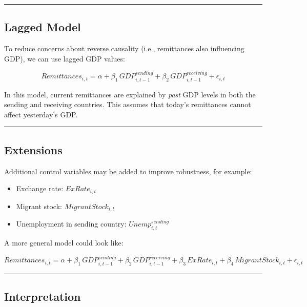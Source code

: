 \documentclass[
  11pt,
]{article}
\providecommand{\tightlist}{%
  \setlength{\itemsep}{0pt}\setlength{\parskip}{0pt}}\usepackage{longtable,booktabs,array}
\begin{document}
\begin{center}\rule{0.5\linewidth}{0.5pt}\end{center}

\subsection{Lagged Model}\label{lagged-model}

To reduce concerns about reverse causality (i.e., remittances also
influencing GDP), we can use lagged GDP values:

\[
Remittances_{i,t} = \alpha 
+ \beta_1 \, GDP^{sending}_{i,t-1} 
+ \beta_2 \, GDP^{receiving}_{i,t-1} 
+ \epsilon_{i,t}
\]

In this model, current remittances are explained by \emph{past} GDP
levels in both the sending and receiving countries. This assumes that
today's remittances cannot affect yesterday's GDP.

\begin{center}\rule{0.5\linewidth}{0.5pt}\end{center}

\subsection{Extensions}\label{extensions}

Additional control variables may be added to improve robustness, for
example:

\begin{itemize}
\tightlist
\item
  Exchange rate: \(ExRate_{i,t}\)\\
\item
  Migrant stock: \(MigrantStock_{i,t}\)\\
\item
  Unemployment in sending country: \(Unemp^{sending}_{i,t}\)
\end{itemize}

A more general model could look like:

\[
Remittances_{i,t} = \alpha 
+ \beta_1 \, GDP^{sending}_{i,t-1} 
+ \beta_2 \, GDP^{receiving}_{i,t-1} 
+ \beta_3 \, ExRate_{i,t} 
+ \beta_4 \, MigrantStock_{i,t} 
+ \epsilon_{i,t}
\]

\begin{center}\rule{0.5\linewidth}{0.5pt}\end{center}

\subsection{Interpretation}\label{interpretation}
\end{document}
